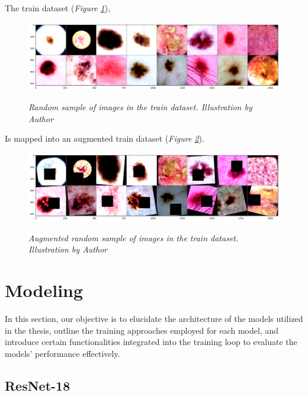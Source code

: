The train dataset (\textit{Figure \ref{fig:sample-of-datasets}}),

\begin{figure}[H]
  \centering
  \includegraphics[width=\textwidth]{imatges/methodological_contribution/random-sample-of-isic.png}
  \caption[Random sample of images in the train dataset]{\textit{Random sample of images in the train dataset. Illustration by Author}}
  {\label{fig:sample-of-datasets}}
\end{figure}

Is mapped into an augmented train dataset (\textit{Figure \ref{fig:aug-sample-of-datasets}}).

\begin{figure}[H]
  \centering
  \includegraphics[width=\textwidth]{imatges/methodological_contribution/random-sample-of-isic-augmented.png}
  \caption[Augmented random sample of images in the train dataset]{\textit{Augmented random sample of images in the train dataset. Illustration by Author}}
  {\label{fig:aug-sample-of-datasets}}
\end{figure}

\newpage

\section{Modeling}

In this section, our objective is to elucidate the architecture of the models
utilized in the thesis, outline the training approaches employed for each
model, and introduce certain functionalities integrated into the training loop
to evaluate the models' performance effectively.

\subsection{ResNet-18}

